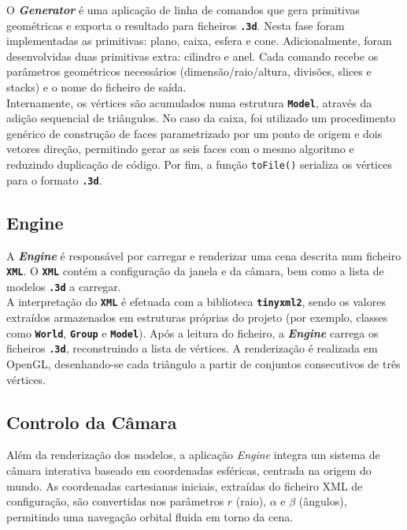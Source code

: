 \documentclass[11pt, a4paper, fleqn]{article}
\begin{document}
O \textbf{\textit{Generator}} é uma aplicação de linha de comandos que gera primitivas geométricas e exporta o resultado para ficheiros \textbf{\texttt{.3d}}. Nesta fase foram implementadas as primitivas: plano, caixa, esfera e cone. Adicionalmente, foram desenvolvidas duas primitivas extra: cilindro e anel. Cada comando recebe os parâmetros geométricos necessários (dimensão/raio/altura, divisões, slices e stacks) e o nome do ficheiro de saída. \\

\noindent Internamente, os vértices são acumulados numa estrutura \textbf{\texttt{Model}}, através da adição sequencial de triângulos. No caso da caixa, foi utilizado um procedimento genérico de construção de faces parametrizado por um ponto de origem e dois vetores direção, permitindo gerar as seis faces com o mesmo algoritmo e reduzindo duplicação de código. Por fim, a função \texttt{toFile()} serializa os vértices para o formato \textbf{\texttt{.3d}}.

\subsection{Engine}

A \textbf{\textit{Engine}} é responsável por carregar e renderizar uma cena descrita num ficheiro \textbf{\texttt{XML}}. O \textbf{\texttt{XML}} contém a configuração da janela e da câmara, bem como a lista de modelos \textbf{\texttt{.3d}} a carregar. \\

\noindent A interpretação do \textbf{\texttt{XML}} é efetuada com a biblioteca \textbf{\texttt{tinyxml2}}, sendo os valores extraídos armazenados em estruturas próprias do projeto (por exemplo, classes como \textbf{\texttt{World}}, \textbf{\texttt{Group}} e \textbf{\texttt{Model}}). Após a leitura do ficheiro, a \textbf{\textit{Engine}} carrega os ficheiros \textbf{\texttt{.3d}}, reconstruindo a lista de vértices. A renderização é realizada em OpenGL, desenhando-se cada triângulo a partir de conjuntos consecutivos de três vértices.

\subsection{Controlo da Câmara}

Além da renderização dos modelos, a aplicação \textit{Engine} integra um sistema de câmara interativa baseado em coordenadas esféricas, centrada na origem do mundo. As coordenadas cartesianas iniciais, extraídas do ficheiro XML de configuração, são convertidas nos parâmetros $r$ (raio), $\alpha$ e $\beta$ (ângulos), permitindo uma navegação orbital fluida em torno da cena.\\
\end{document}

